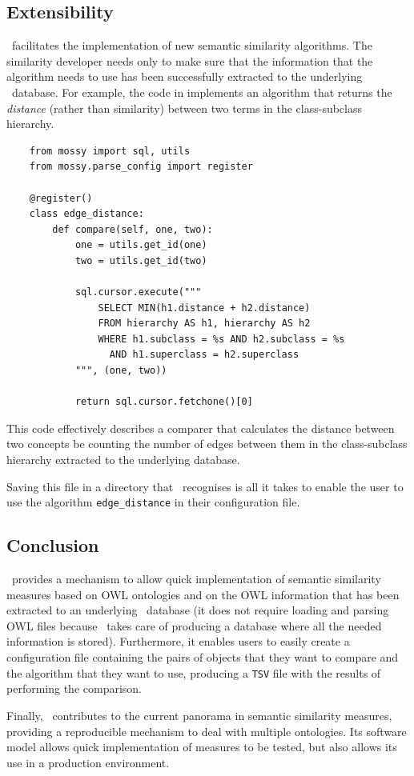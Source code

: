 \subsection{Extensibility} \label{sub:mossy/extensibility}

\mossy\ facilitates the implementation of new semantic similarity algorithms. The similarity developer needs only to make sure that the information that the algorithm needs to use has been successfully extracted to the underlying \owlsql\ database. For example, the code in  implements an algorithm that returns the \emph{distance} (rather than similarity) between two terms in the class-subclass hierarchy.

\begin{listing}
\centering
\begin{verbatim}
    from mossy import sql, utils
    from mossy.parse_config import register
    
    @register()
    class edge_distance:
        def compare(self, one, two):
            one = utils.get_id(one)
            two = utils.get_id(two)
            
            sql.cursor.execute("""
                SELECT MIN(h1.distance + h2.distance)
                FROM hierarchy AS h1, hierarchy AS h2
                WHERE h1.subclass = %s AND h2.subclass = %s
                  AND h1.superclass = h2.superclass
            """, (one, two))
            
            return sql.cursor.fetchone()[0]
\end{verbatim}
\caption[The code of a new \mossy\ plugin]{This code effectively describes a comparer that calculates the distance between two concepts be counting the number of edges between them in the class-subclass hierarchy extracted to the underlying database.}
\label{lst:mossy-plugin}
\end{listing}

Saving this file in a directory that \mossy\ recognises is all it takes to enable the user to use the algorithm \texttt{edge\_distance} in their configuration file.


\subsection{Conclusion} \label{sub:mossy/conclusion}

\mossy\ provides a mechanism to allow quick implementation of semantic similarity measures based on OWL ontologies and on the OWL information that has been extracted to an underlying \owlsql\ database (it does not require loading and parsing OWL files because \owlsql\ takes care of producing a database where all the needed information is stored). Furthermore, it enables users to easily create a configuration file containing the pairs of objects that they want to compare and the algorithm that they want to use, producing a \texttt{TSV} file with the results of performing the comparison.

Finally, \mossy\ contributes to the current panorama in semantic similarity measures, providing a reproducible mechanism to deal with multiple ontologies. Its software model allows quick implementation of measures to be tested, but also allows its use in a production environment.

